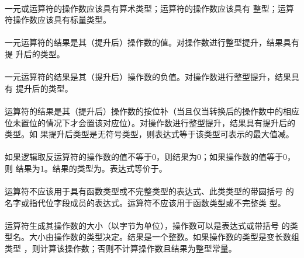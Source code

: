 {                                  
\constraint
\paragraph{}
一元\tm{+}或\tm{-}运算符的操作数应该具有算术类型；\tm{\~}运算符的操作数应该具有
整型；\tm{!}运算符操作数应该具有标量类型。

\semantic
\paragraph{}
一元\tm{+}运算符的结果是其（提升后）操作数的值。对操作数进行整型提升，结果具有提
升后的类型。

\paragraph{}
一元\tm{-}运算符的结果是其（提升后）操作数的负值。对操作数进行整型提升，结果具有
提升后的类型。

\paragraph{}
运算符\tm{\~}的结果是其（提升后）操作数的按位补（当且仅当转换后的操作数中的相应
位未置位的情况下才会置该对应位）。对操作数进行整型提升，结果具有提升后的类型。如
果提升后类型是无符号类型，则表达式等于该类型可表示的最大值减。

\paragraph{}
如果逻辑取反运算符\tm{!}的操作数的值不等于0，则结果为0；如果操作数的值等于0，则
结果为1。结果的类型为。表达式等价于。

\constraint
\paragraph{}
运算符不应该用于具有函数类型或不完整类型的表达式、此类类型的带圆括号
的名字或指代位字段成员的表达式。运算符不应该用于函数类型或不完整类
型。

\semantic
\paragraph{}
运算符生成其操作数的大小（以字节为单位），操作数可以是表达式或带括号
的类型名。大小由操作数的类型决定。结果是一个整数。如果操作数的类型是变长数组类型
，则计算该操作数；否则不计算操作数且结果为整型常量。

}
